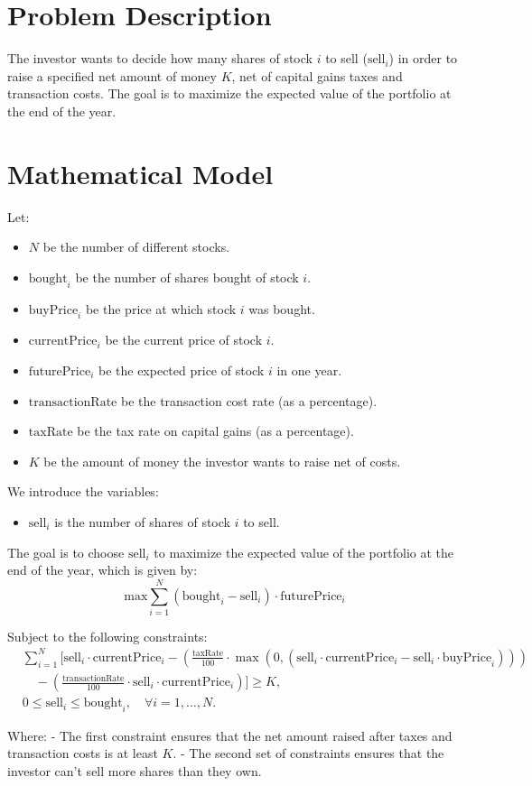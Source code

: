 \documentclass{article}
\begin{document}
\section*{Problem Description}

The investor wants to decide how many shares of stock \(i\) to sell (\( \text{sell}_i \)) in order to raise a specified net amount of money \(K\), net of capital gains taxes and transaction costs. The goal is to maximize the expected value of the portfolio at the end of the year.

\section*{Mathematical Model}

Let:
\begin{itemize}
    \item \(N\) be the number of different stocks.
    \item \(\text{bought}_i\) be the number of shares bought of stock \(i\).
    \item \(\text{buyPrice}_i\) be the price at which stock \(i\) was bought.
    \item \(\text{currentPrice}_i\) be the current price of stock \(i\).
    \item \(\text{futurePrice}_i\) be the expected price of stock \(i\) in one year.
    \item \(\text{transactionRate}\) be the transaction cost rate (as a percentage).
    \item \(\text{taxRate}\) be the tax rate on capital gains (as a percentage).
    \item \(K\) be the amount of money the investor wants to raise net of costs.
\end{itemize}

We introduce the variables:
\begin{itemize}
    \item \(\text{sell}_i\) is the number of shares of stock \(i\) to sell.
\end{itemize}

The goal is to choose \(\text{sell}_i\) to maximize the expected value of the portfolio at the end of the year, which is given by:
\[ 
\text{max} \sum_{i=1}^{N} \left( \text{bought}_i - \text{sell}_i \right) \cdot \text{futurePrice}_i 
\]

Subject to the following constraints:
\begin{align*}
    &\sum_{i=1}^{N} \bigg[ \text{sell}_i \cdot \text{currentPrice}_i - \left( \frac{\text{taxRate}}{100} \cdot \max(0, \left( \text{sell}_i \cdot \text{currentPrice}_i - \text{sell}_i \cdot \text{buyPrice}_i \right)) \right) \\
    &\quad - \left( \frac{\text{transactionRate}}{100} \cdot \text{sell}_i \cdot \text{currentPrice}_i \right) \bigg] \geq K, \\
    &0 \leq \text{sell}_i \leq \text{bought}_i, \quad \forall i = 1, \ldots, N.
\end{align*}

Where:
- The first constraint ensures that the net amount raised after taxes and transaction costs is at least \(K\).
- The second set of constraints ensures that the investor can't sell more shares than they own.
\end{document}
